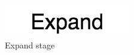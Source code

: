 \begin{figure}[ht]
\vskip 0.2in
\begin{center}
\centerline{\includegraphics[width=\columnwidth]{images/expand_vertical.png}}
\caption{Expand stage}
\end{center}
\vskip -0.2in
\label{fig:exapand}
\end{figure} 




\begin{figure}[ht]
\vskip 0.2in
\begin{center}

\end{center}
\end{figure}
